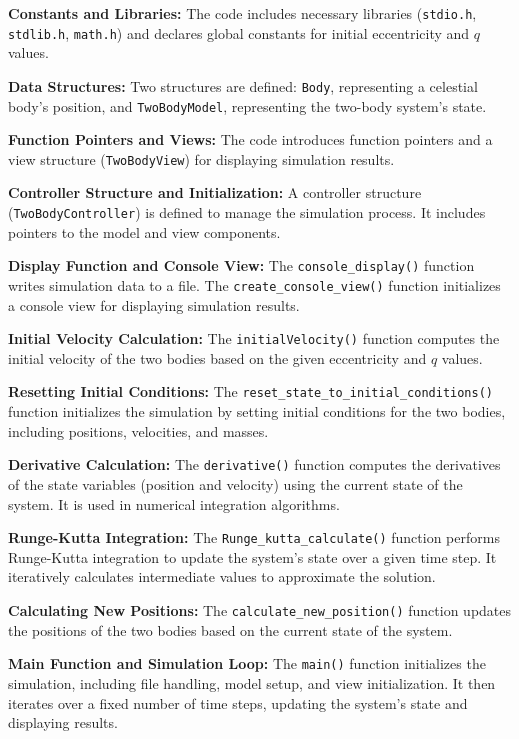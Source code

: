\documentclass{article}
\begin{document}
\textbf{Constants and Libraries:}
The code includes necessary libraries (\texttt{stdio.h}, \texttt{stdlib.h}, \texttt{math.h}) and declares global constants for initial eccentricity and $q$ values.

\textbf{Data Structures:}
Two structures are defined: \texttt{Body}, representing a celestial body's position, and \texttt{TwoBodyModel}, representing the two-body system's state.

\textbf{Function Pointers and Views:}
The code introduces function pointers and a view structure (\texttt{TwoBodyView}) for displaying simulation results.

\textbf{Controller Structure and Initialization:}
A controller structure (\texttt{TwoBodyController}) is defined to manage the simulation process. It includes pointers to the model and view components.

\textbf{Display Function and Console View:}
The \texttt{console\_display()} function writes simulation data to a file. The \texttt{create\_console\_view()} function initializes a console view for displaying simulation results.

\textbf{Initial Velocity Calculation:}
The \texttt{initialVelocity()} function computes the initial velocity of the two bodies based on the given eccentricity and $q$ values.

\textbf{Resetting Initial Conditions:}
The \texttt{reset\_state\_to\_initial\_conditions()} function initializes the simulation by setting initial conditions for the two bodies, including positions, velocities, and masses.

\textbf{Derivative Calculation:}
The \texttt{derivative()} function computes the derivatives of the state variables (position and velocity) using the current state of the system. It is used in numerical integration algorithms.

\textbf{Runge-Kutta Integration:}
The \texttt{Runge\_kutta\_calculate()} function performs Runge-Kutta integration to update the system's state over a given time step. It iteratively calculates intermediate values to approximate the solution.

\textbf{Calculating New Positions:}
The \texttt{calculate\_new\_position()} function updates the positions of the two bodies based on the current state of the system.

\textbf{Main Function and Simulation Loop:}
The \texttt{main()} function initializes the simulation, including file handling, model setup, and view initialization. It then iterates over a fixed number of time steps, updating the system's state and displaying results.
\end{document}
